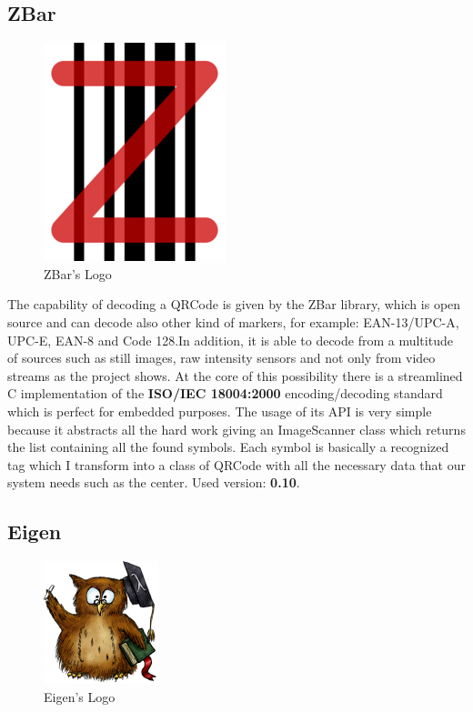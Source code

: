 \subsection{ZBar}
\begin{figure}[hbt]
    \centering
    \includegraphics[scale=0.5]{img/zbar.png}
    \caption{ZBar's Logo}
\end{figure}
The capability of decoding a QRCode is given by the ZBar library, which is open source and can decode also other kind of markers, for example: EAN-13/UPC-A, UPC-E, EAN-8 and Code 128.In addition, it is able to decode from a multitude of sources such as still images, raw intensity sensors and not only from video streams as the project shows. At the core of this possibility there is a streamlined C implementation of the \textbf{ISO/IEC 18004:2000} encoding/decoding standard which is perfect for embedded purposes.
The usage of its API is very simple because it abstracts all the hard work giving an ImageScanner class which returns the list containing all the found symbols. Each symbol is basically a recognized tag which I transform into a class of QRCode with all the necessary data that our system needs such as the center.
\newline Used version: \textbf{0.10}.

\subsection{Eigen}

\begin{figure}[hbt]
    \centering
    \includegraphics[scale=0.5]{img/eigen.png}
    \caption{Eigen's Logo}
\end{figure}

